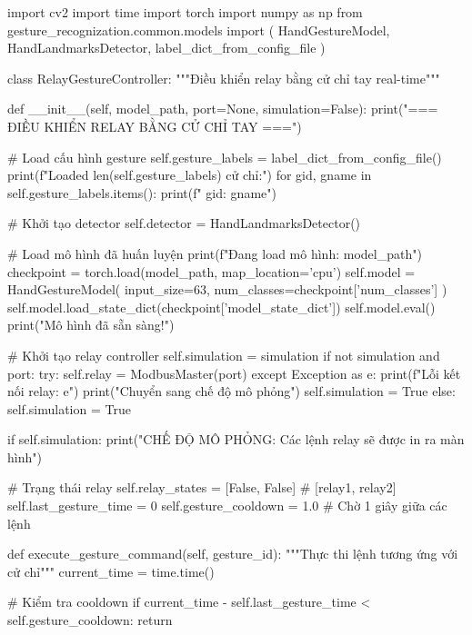 \begin{aivncodebox}
\begin{python}
import cv2
import time
import torch
import numpy as np
from gesture_recognization.common.models import (
    HandGestureModel, 
    HandLandmarksDetector, 
    label_dict_from_config_file
)

class RelayGestureController:
    """Điều khiển relay bằng cử chỉ tay real-time"""
    
    def __init__(self, model_path, port=None, simulation=False):
        print("=== ĐIỀU KHIỂN RELAY BẰNG CỬ CHỈ TAY ===")
        
        # Load cấu hình gesture
        self.gesture_labels = label_dict_from_config_file()
        print(f"Loaded {len(self.gesture_labels)} cử chỉ:")
        for gid, gname in self.gesture_labels.items():
            print(f"  {gid}: {gname}")
        
        # Khởi tạo detector
        self.detector = HandLandmarksDetector()
        
        # Load mô hình đã huấn luyện
        print(f"Đang load mô hình: {model_path}")
        checkpoint = torch.load(model_path, map_location='cpu')
        self.model = HandGestureModel(
            input_size=63, 
            num_classes=checkpoint['num_classes']
        )
        self.model.load_state_dict(checkpoint['model_state_dict'])
        self.model.eval()
        print("Mô hình đã sẵn sàng!")
        
        # Khởi tạo relay controller
        self.simulation = simulation
        if not simulation and port:
            try:
                self.relay = ModbusMaster(port)
            except Exception as e:
                print(f"Lỗi kết nối relay: {e}")
                print("Chuyển sang chế độ mô phỏng")
                self.simulation = True
        else:
            self.simulation = True
        
        if self.simulation:
            print("CHẾ ĐỘ MÔ PHỎNG: Các lệnh relay sẽ được in ra màn hình")
        
        # Trạng thái relay
        self.relay_states = [False, False]  # [relay1, relay2]
        self.last_gesture_time = 0
        self.gesture_cooldown = 1.0  # Chờ 1 giây giữa các lệnh
    
    def execute_gesture_command(self, gesture_id):
        """Thực thi lệnh tương ứng với cử chỉ"""
        current_time = time.time()
        
        # Kiểm tra cooldown
        if current_time - self.last_gesture_time < self.gesture_cooldown:
            return
        

\end{python}
\end{aivncodebox}
